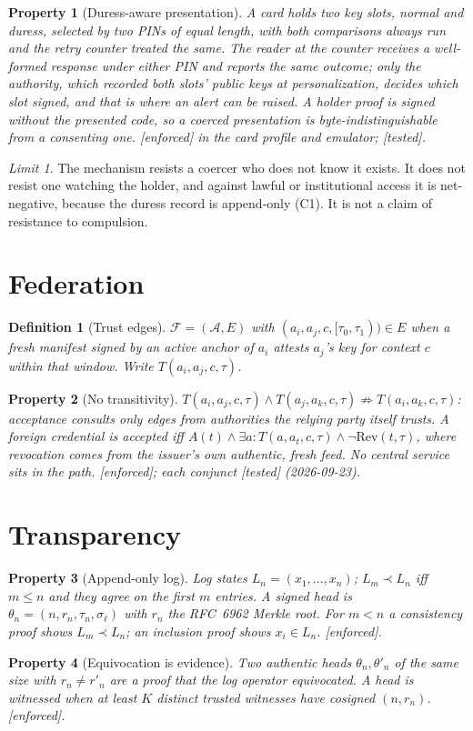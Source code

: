 \documentclass[11pt]{article}
\newtheorem{property}{Property}
\newtheorem{definition}{Definition}
\theoremstyle{remark}
\newtheorem*{limit}{Limit}
\newcommand{\Ag}{\mathcal A}
\newcommand{\emark}[1]{\textup{\textsf{[#1]}}}
\begin{document}
\begin{property}[Duress-aware presentation] A card holds two key slots, normal and duress, selected by
two PINs of equal length, with both comparisons always run and the retry counter treated the same.
The reader at the counter receives a well-formed response under either PIN and reports the same
outcome; only the authority, which recorded both slots' public keys at personalization, decides which
slot signed, and that is where an alert can be raised. A holder proof is signed without the presented
code, so a coerced presentation is byte-indistinguishable from a consenting one. \emark{enforced} in
the card profile and emulator; \emark{tested}.
\end{property}
\begin{limit}
The mechanism resists a coercer who does not know it exists. It does not resist one watching the
holder, and against lawful or institutional access it is net-negative, because the duress record is
append-only (C1). It is not a claim of resistance to compulsion.
\end{limit}

\section{Federation}

\begin{definition}[Trust edges] $\mathcal F=(\Ag,E)$ with $(a_i,a_j,c,[\tau_0,\tau_1))\in E$ when a
fresh manifest signed by an active anchor of $a_i$ attests $a_j$'s key for context $c$ within that
window. Write $T(a_i,a_j,c,\tau)$.
\end{definition}
\begin{property}[No transitivity] $T(a_i,a_j,c,\tau)\wedge T(a_j,a_k,c,\tau)\not\Rightarrow
T(a_i,a_k,c,\tau)$: acceptance consults only edges from authorities the relying party itself trusts.
A foreign credential is accepted iff $A(t)\wedge \exists a: T(a,a_t,c,\tau)\wedge \neg\mathrm{Rev}(t,\tau)$,
where revocation comes from the issuer's own authentic, fresh feed. No central service sits in the
path. \emark{enforced}; each conjunct \emark{tested} (2026-09-23).
\end{property}

\section{Transparency}

\begin{property}[Append-only log] Log states $L_n=(x_1,\dots,x_n)$; $L_m\prec L_n$ iff $m\le n$ and
they agree on the first $m$ entries. A signed head is $\theta_n=(n,r_n,\tau_n,\sigma_\ell)$ with
$r_n$ the RFC~6962 Merkle root. For $m<n$ a consistency proof shows $L_m\prec L_n$; an inclusion
proof shows $x_i\in L_n$. \emark{enforced}.
\end{property}
\begin{property}[Equivocation is evidence] Two authentic heads $\theta_n,\theta'_n$ of the same size
with $r_n\neq r'_n$ are a proof that the log operator equivocated. A head is \emph{witnessed} when at
least $K$ distinct trusted witnesses have cosigned $(n,r_n)$. \emark{enforced}.
\end{property}
\end{document}
